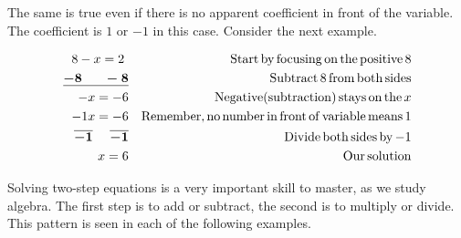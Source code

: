  The same is true even if there is no apparent coefficient in front of the variable.  The coefficient is $1$ or $-1$ in this case.
Consider the next example.

\begin{example}\label{Lin16}
 
  
  \begin{eqnarray*}
    8 - x = 2~ &  & \operatorname{Start} \operatorname{by} \operatorname{focusing} \operatorname{on} \operatorname{the}
    \operatorname{positive} 8\\
    \boldsymbol{\underline{- 8 ~~~~~- 8}} &  & \operatorname{Subtract} 8 \operatorname{from}
    \operatorname{both} \operatorname{sides}\\
    - x = - 6 &  & \operatorname{Negative} (\operatorname{subtraction}) \operatorname{stays} \operatorname{on}
    \operatorname{the} x\\
    - 1 x = - 6 &  & \operatorname{Remember}, \operatorname{no} \operatorname{number} \operatorname{in}
    \operatorname{front} \operatorname{of} \operatorname{variable} \operatorname{means} 1\\
    \boldsymbol{\overline{- 1} ~~~~ \overline{- 1}} &  & \operatorname{Divide} \operatorname{both}
    \operatorname{sides} \operatorname{by} - 1\\
    x = 6 &  & \operatorname{Our} \operatorname{solution}
  \end{eqnarray*}
\end{example}

 Solving two-step equations is a very important skill to master, as we study
algebra. The first step is to add or subtract, the second is to multiply or
divide. This pattern is seen in each of the following examples.

\pagebreak

\begin{example}\label{Lin17}
~\end{example}
 
